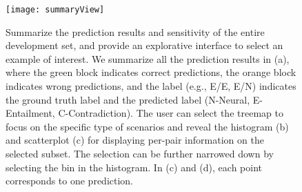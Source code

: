\begin{figure}[htbp]
\centering
\vspace{-2mm}
 \texttt{[image: summaryView]}
 \caption{
Summarize the prediction results and sensitivity of the entire development set, and provide an explorative interface to select an example of interest.
We summarize all the prediction results in (a), where the green block indicates correct predictions, the orange block indicates wrong predictions, and the label (e.g., E/E, E/N) indicates the ground truth label and the predicted label (N-Neural, E-Entailment, C-Contradiction).
%
The user can select the treemap to focus on the specific type of scenarios and reveal the histogram (b) and scatterplot (c) for displaying per-pair information on the selected subset.
The selection can be further narrowed down by selecting the bin in the histogram.
In (c) and (d), each point corresponds to one prediction.
 }
\label{fig:summaryView}
\end{figure}

